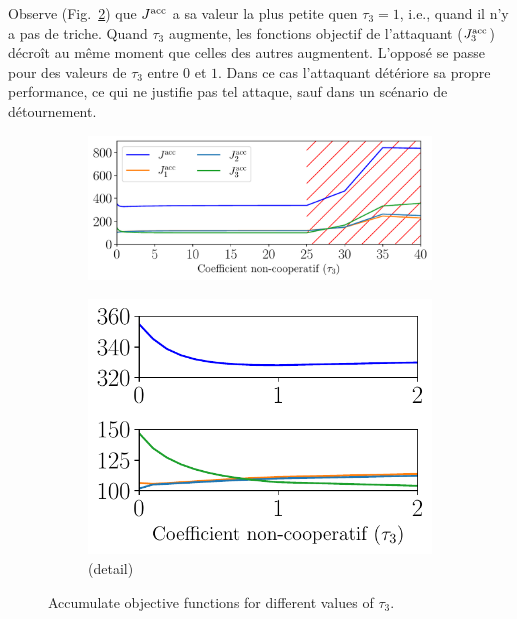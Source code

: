 \documentclass[../main.tex]{subfiles}
\begin{document}
Observe (Fig.~\ref{fig:example_vary_tau_objective_detail_fr}) que $\Jacc$ a sa valeur la plus petite quen $\tau_{3}=1$, i.e., quand il n'y a pas de triche.
Quand $\tau_{3}$ augmente, les fonctions objectif de l'attaquant ($\Jiacc[3]$) décroît au même moment que celles des autres augmentent.
L'opposé se passe pour des valeurs de $\tau_{3}$ entre $0$ et $1$.
Dans ce cas l'attaquant détériore sa propre performance, ce qui ne justifie pas tel attaque, sauf dans un scénario de détournement.

\begin{figure}[h]
  \centering
  \begin{subfigure}{0.50\textwidth}
    \includegraphics[width=\textwidth]{../img/example_primal_decomposition/example_vary_tau_J_fr.pdf}
    \caption{}\label{fig:example_vary_tau_objective_fr}
  \end{subfigure}
  \begin{subfigure}{0.3\textwidth}
    \includegraphics[width=\textwidth]{../img/example_primal_decomposition/example_vary_tau_J_detail_fr.pdf}
    \caption{(detail)}\label{fig:example_vary_tau_objective_detail_fr}
  \end{subfigure}
  \caption{Accumulate objective functions for different values of $\tau_{3}$.}\label{fig:example_vary_tau_objective_both_fr}
\end{figure}
\end{document}
